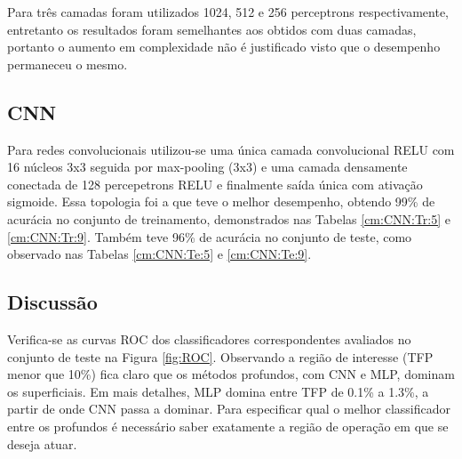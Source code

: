 \begin{table}

\end{table}

Para três camadas foram utilizados 1024, 512 e 256 perceptrons respectivamente, entretanto os resultados foram semelhantes aos obtidos com duas camadas, portanto o aumento em complexidade não é justificado visto que o desempenho permaneceu o mesmo.

\subsection{CNN}
Para redes convolucionais utilizou-se uma única camada convolucional RELU com 16 núcleos 3x3 seguida por max-pooling (3x3) e uma camada densamente conectada de 128 percepetrons RELU e finalmente saída única com ativação sigmoide. Essa topologia foi a que teve o melhor desempenho, obtendo 99\% de acurácia no conjunto de treinamento, demonstrados nas Tabelas \ref{cm:CNN:Tr:5} e \ref{cm:CNN:Tr:9}. Também teve 96\% de acurácia no conjunto de teste, como observado nas Tabelas \ref{cm:CNN:Te:5} e \ref{cm:CNN:Te:9}.

\begin{table}

\end{table}


\subsection{Discussão}
Verifica-se as curvas ROC dos classificadores correspondentes avaliados no conjunto de teste na Figura \ref{fig:ROC}. Observando a região de interesse (TFP menor que 10\%) fica claro que os métodos profundos, com CNN e MLP, dominam os superficiais. Em mais detalhes, MLP domina entre TFP de 0.1\% a 1.3\%, a partir de onde CNN passa a dominar. Para especificar qual o melhor classificador entre os profundos é necessário saber exatamente a região de operação em que se deseja atuar. 

